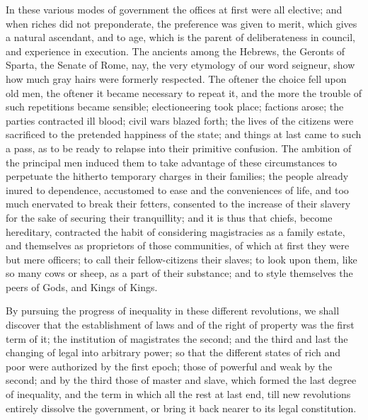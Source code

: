 \documentclass[11pt,twocolumn]{ltugboat}
\begin{document}
In these various modes of government the offices at first were all
elective; and when riches did not preponderate, the preference was
given to merit, which gives a natural ascendant, and to age, which is
the parent of deliberateness in council, and experience in execution.
The ancients among the Hebrews, the Geronts of Sparta, the Senate of
Rome, nay, the very etymology of our word seigneur, show how much gray
hairs were formerly respected. The oftener the choice fell upon old
men, the oftener it became necessary to repeat it, and the more the
trouble of such repetitions became sensible; electioneering took
place; factions arose; the parties contracted ill blood; civil wars
blazed forth; the lives of the citizens were sacrificed to the
pretended happiness of the state; and things at last came to such a
pass, as to be ready to relapse into their primitive confusion. The
ambition of the principal men induced them to take advantage of these
circumstances to perpetuate the hitherto temporary charges in their
families; the people already inured to dependence, accustomed to ease
and the conveniences of life, and too much enervated to break their
fetters, consented to the increase of their slavery for the sake of
securing their tranquillity; and it is thus that chiefs, become
hereditary, contracted the habit of considering magistracies as a
family estate, and themselves as proprietors of those communities, of
which at first they were but mere officers; to call their
fellow-citizens their slaves; to look upon them, like so many cows or
sheep, as a part of their substance; and to style themselves the peers
of Gods, and Kings of Kings.

By pursuing the progress of inequality in these different revolutions,
we shall discover that the establishment of laws and of the right of
property was the first term of it; the institution of magistrates the
second; and the third and last the changing of legal into arbitrary
power; so that the different states of rich and poor were authorized
by the first epoch; those of powerful and weak by the second; and by
the third those of master and slave, which formed the last degree of
inequality, and the term in which all the rest at last end, till new
revolutions entirely dissolve the government, or bring it back nearer
to its legal constitution.
\end{document}
